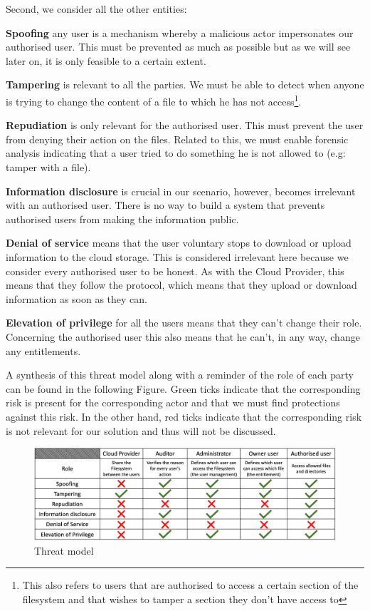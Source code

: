 \documentclass[../main.tex]{subfiles}
\begin{document}
\par Second, we consider all the other entities:
\par \textbf{Spoofing} any user is a mechanism whereby a malicious actor impersonates our authorised user. This must be prevented as much as possible but as we will see later on, it is only feasible to a certain extent.
\par \textbf{Tampering} is relevant to all the parties. We must be able to detect when anyone is trying to change the content of a file to which he has not access\footnote{This also refers to users that are authorised to access a certain section of the filesystem and that wishes to tamper a section they don't have access to}.
\par \textbf{Repudiation} is only relevant for the authorised user. This must prevent the user from denying their action on the files. Related to this, we must enable forensic analysis indicating that a user tried to do something he is not allowed to (e.g: tamper with a file).
\par \textbf{Information disclosure} is crucial in our scenario, however, becomes irrelevant with an authorised user. There is no way to build a system that prevents authorised users from making the information public.
\par \textbf{Denial of service} means that the user voluntary stops to download or upload information to the cloud storage. This is considered irrelevant here because we consider every authorised user to be honest. As with the Cloud Provider, this means that they follow the protocol, which means that they upload or download information as soon as they can.
\par \textbf{Elevation of privilege} for all the users means that they can't change their role. Concerning the authorised user this also means that he can't, in any way, change any entitlements.

\medbreak
\par A synthesis of this threat model along with a reminder of the role of each party can be found in the following Figure. Green ticks indicate that the corresponding risk is present for the corresponding actor and that we must find protections against this risk. In the other hand, red ticks indicate that the corresponding risk is not relevant for our solution and thus will not be discussed.
\begin{figure}[h]
    \centering
    \includegraphics[width=\textwidth]{images/problem/threat_model}
    
    \caption{Threat model}
    \label{figure:problem:threat_model}
\end{figure}
\end{document}
